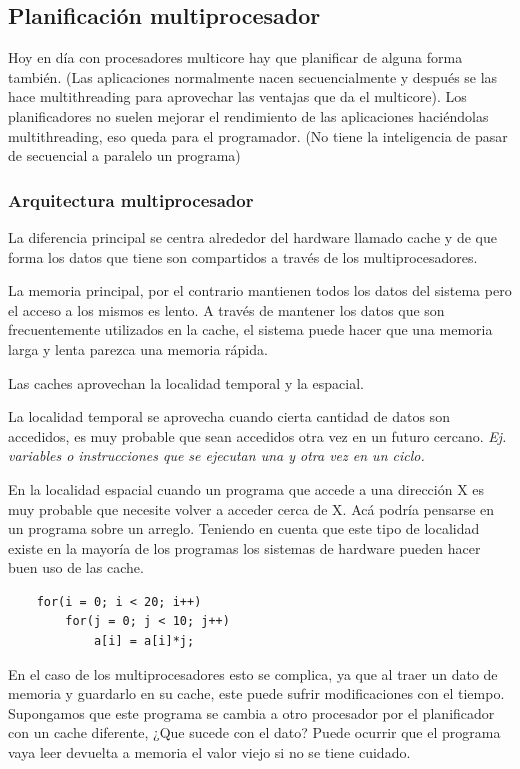 \documentclass[titlepage,a4paper]{article}
\begin{document}
\subsection*{Planificación multiprocesador}
Hoy en día con procesadores multicore hay que planificar de alguna forma también. (Las aplicaciones normalmente nacen secuencialmente y después se las hace multithreading para aprovechar las ventajas que da el multicore). Los planificadores no suelen mejorar el rendimiento de las aplicaciones haciéndolas multithreading, eso queda para el programador. (No tiene la inteligencia de pasar de secuencial a paralelo un programa)

\subsubsection*{Arquitectura multiprocesador}
La diferencia principal se centra alrededor del hardware llamado cache y de que forma los datos que tiene son compartidos a través de los multiprocesadores.

La memoria principal, por el contrario mantienen todos los datos del sistema pero el acceso a los mismos es lento. A través de mantener los datos que son frecuentemente utilizados en la cache, el sistema puede hacer que una memoria larga y lenta parezca una memoria rápida.

Las caches aprovechan la localidad temporal y la espacial.

La localidad temporal se aprovecha cuando cierta cantidad de datos son accedidos, es muy probable que sean accedidos otra vez en un futuro cercano. \textit{Ej. variables o instrucciones que se ejecutan una y otra vez en un ciclo.}

En la localidad espacial cuando un programa que accede a una dirección X es muy probable que necesite volver a acceder cerca de X. Acá podría pensarse en un programa sobre un arreglo. Teniendo en cuenta que este tipo de localidad existe en la mayoría de los programas los sistemas de hardware pueden hacer buen uso de las cache.

\begin{verbatim}
    for(i = 0; i < 20; i++)
        for(j = 0; j < 10; j++)
            a[i] = a[i]*j;
\end{verbatim}

En el caso de los multiprocesadores esto se complica, ya que al traer un dato de memoria y guardarlo en su cache, este puede sufrir modificaciones con el tiempo. Supongamos que este programa se cambia a otro procesador por el planificador con un cache diferente, ¿Que sucede con el dato? Puede ocurrir que el programa vaya leer devuelta a memoria el valor viejo si no se tiene cuidado.
\end{document}
